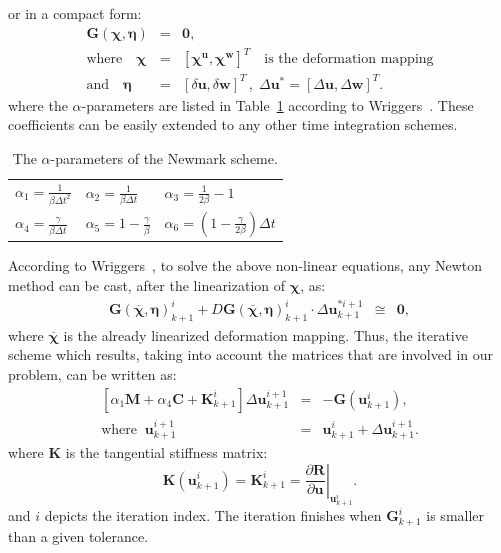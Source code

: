 \documentclass[preprint,12pt,a4paper]{elsarticle}
\begin{document}
or  in a compact form:
\begin{eqnarray} \label{eq_uw23}
\boldsymbol{G}(\boldsymbol{\chi},\boldsymbol{\eta})&=&\boldsymbol{0},\\
\mbox{where} \quad \boldsymbol{\chi}&=&\left[ \boldsymbol{\chi^u} ,\boldsymbol{\chi^w}\right]^{T} \quad  \mbox{is the deformation mapping}
\nonumber \\
\mbox{and} \quad 
\boldsymbol{\eta}&=&\left[\delta\boldsymbol{u},\delta\boldsymbol{w}\right]^T \, , \; \Delta\boldsymbol{u^*}=\left[\Delta\boldsymbol{u},\Delta\boldsymbol{w}\right]^T.
\nonumber
\end{eqnarray}
where the $\alpha$-parameters are listed in Table~\ref{tab1} according to Wriggers~\cite{wriggers:08}. These coefficients can be easily extended to any other time integration schemes. 

\begin{table}
\caption{\label{tab1} The $\alpha$-parameters of the Newmark scheme.} 
\centering
	\begin{tabular}{lll}
	 $\alpha_1=\frac{1}{\beta\Delta t^2}$ & 	 $\alpha_2=\frac{1}{\beta\Delta t}$ & 
	 $\alpha_3=\frac{1}{2\beta}-1$ \\
	 $\alpha_4=\frac{\gamma}{\beta\Delta t}$ &  
	 	 $\alpha_5=1-\frac{\gamma}{\beta}$&
	 $\alpha_6=\left(1-\frac{\gamma}{2\beta}\right)\Delta t$
	\end{tabular}
\end{table}

According to Wriggers~\cite{wriggers:08}, to solve the above non-linear equations, any Newton method  can be cast, after the linearization of $ \boldsymbol{\chi}$, as: 
\begin{eqnarray} \label{eq_uw24}
\boldsymbol{G}(\boldsymbol{\overline{\chi}},\boldsymbol{\eta})_{k+1}^{i}+D\boldsymbol{G}(\boldsymbol{\overline{\chi}},\boldsymbol{\eta})_{k+1}^{i}\cdot \Delta\boldsymbol{u}^{*i+1}_{k+1} &\cong & \boldsymbol{0},
\end{eqnarray}
where $\boldsymbol{\overline{\chi}}$ is the already linearized deformation mapping. Thus, the iterative scheme which results, taking into account the matrices that are involved in our problem, can be written as:
\begin{eqnarray}\label{eq_uw32}
\left[\alpha_1\boldsymbol {M}+\alpha_4\boldsymbol {C}+\boldsymbol {K}^{i}_{k+1}\right]\Delta\boldsymbol{u}^{i+1}_{k+1} &=& -\boldsymbol {G}(\boldsymbol {u}^{i}_{k+1}), \\
\mbox{where}\;\; \boldsymbol {u}^{i+1}_{k+1} &=& \boldsymbol {u}^{i}_{k+1} + \Delta \boldsymbol {u}^{i+1}_{k+1}.  \nonumber 
\end{eqnarray}
where $\boldsymbol {K}$ is the tangential stiffness matrix:
\begin{equation}\label{eq_uw31}
\boldsymbol {K}(\boldsymbol {u}^{i}_{k+1})=\boldsymbol {K}^{i}_{k+1}=\left.\frac{\partial\boldsymbol {R}}{\partial \boldsymbol {u}}\right|_{\boldsymbol{u}^{i}_{k+1}}.
\end{equation}
and $i$ depicts the iteration index. The iteration finishes when  $\boldsymbol {G}^{i}_{k+1}$ is smaller than a given tolerance.
\end{document}
